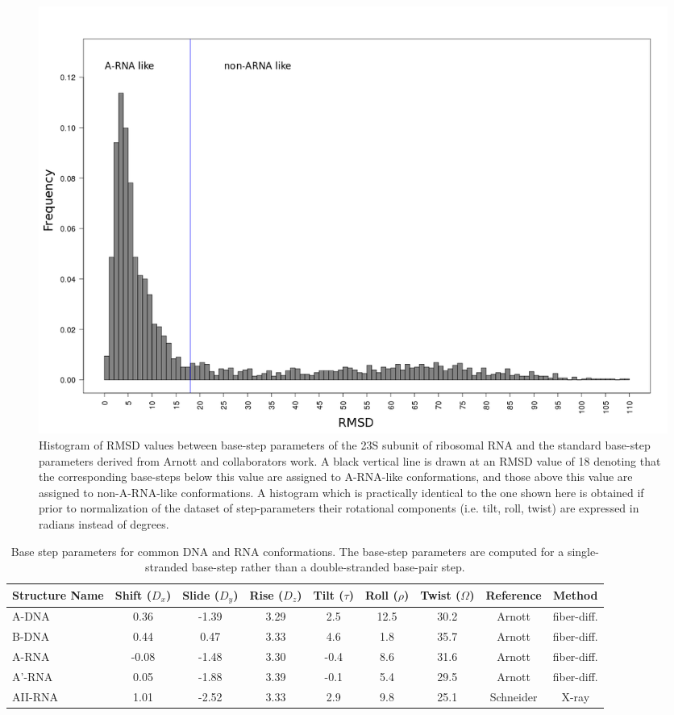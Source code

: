 \begin{figure}[ht]
 \centering
\includegraphics[angle=0, scale=0.38]{Chapter2/dormsd.png}
\caption{Histogram of RMSD values  between base-step parameters of the
23S  subunit of ribosomal  RNA and  the standard  base-step parameters
derived from Arnott and collaborators \cite{arnott1973} work.  A black
vertical  line is  drawn at  an  RMSD value  of 18  denoting that  the
corresponding base-steps  below this value are  assigned to A-RNA-like
conformations,   and  those   above   this  value   are  assigned   to
non-A-RNA-like  conformations.   A   histogram  which  is  practically
identical to the one shown  here is obtained if prior to normalization
of  the   dataset  of  step-parameters   their  rotational  components
(i.e. tilt, roll, twist) are expressed in radians instead of degrees.}
\label{fig:dormsd}
\end{figure}

\begin{table}[ht]
\centering
\small\addtolength{\tabcolsep}{-2pt}
\begin{tabular}{p{1.4cm}|c|c|c|c|c|c|c|c}
\hline
\textbf{Structure Name} & Shift ($D_x$) & Slide ($D_y$) & Rise ($D_z$) & Tilt
($\tau$) & Roll ($\rho$) & Twist ($\Omega$) & \textbf{Reference} &
\textbf{Method} \\ \hline
A-DNA & 0.36 & -1.39 & 3.29 & 2.5 & 12.5 & 30.2 & Arnott
\cite{arnott1999} & fiber-diff. \\ \hline
B-DNA & 0.44 & 0.47 & 3.33 & 4.6 & 1.8 & 35.7   & Arnott
\cite{arnott1999} & fiber-diff. \\ \hline
A-RNA & -0.08 & -1.48 & 3.30 & -0.4 & 8.6 & 31.6 & Arnott
\cite{arnott1999} & fiber-diff. \\ \hline
A'-RNA & 0.05 & -1.88 & 3.39 & -0.1 & 5.4 & 29.5 & Arnott
\cite{arnott1999} & fiber-diff. \\ \hline
AII-RNA & 1.01 & -2.52 & 3.33 & 2.9 & 9.8 & 25.1 & Schneider
\cite{schneider2004} & X-ray \\ \hline
\end{tabular}
\caption{Base    step   parameters    for   common    DNA    and   RNA
  conformations.   The  base-step  parameters   are  computed   for  a
  single-stranded  base-step rather  than a  double-stranded base-pair
  step.}
\label{tab:conf}
\end{table}

